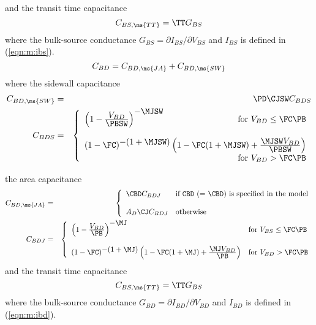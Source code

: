 and the transit time capacitance
\begin{equation}
C_{BS,\ms{TT}} = \TT G_{BS}
\end{equation}
where the bulk-source conductance $G_{BS} = \partial I_{BS} /
\partial V_{BS}$ and $I_{BS}$ is defined in (\ref{eqn:m:ibs}).
\begin{equation}
C_{BD} = C_{BD,\ms{JA}} + C_{BD,\ms{SW}}
\end{equation}
where the sidewall capacitance
\begin{eqnarray}
C_{BD,\ms{SW}} &=& \PD\CJSW C_{BDS} \\
C_{BDS} &=& \left\{ \begin{array}{l}
       \left( 1 - {{\textstyle V_{BD}}
       \over {\textstyle\PBSW}} \right)^{\textstyle -\MJSW}
       \hfill \mbox{for $V_{BD}  \le \FC\PB$} \\ \\
       (1 - \FC )^{\textstyle -(1+\MJSW )}
       \left(1 - \FC (1+\MJSW )
       + {{\textstyle \MJSW V_{BD}}
       \over { \textstyle \PBSW}} \right)
       \\ \hspace*{\fill} \mbox{for $V_{BD}  > \FC\PB$}
       \end{array} \right. \\ %
\end{eqnarray}

the area capacitance
\begin{eqnarray}
C_{BD,\ms{JA}} &=&
  \left\{ \begin{array}{ll}
  \CBD C_{BDJ} &  \mbox{if {\tt CBD} (= $\CBD$)
                    is specified in the model} \\ \\
  A_D\CJ C_{BDJ} & \mbox{otherwise} \end{array} \right. \\ %
C_{BDJ} &=& \left\{ \begin{array}{ll}
       \left(1 - {\textstyle {V_{BD}} \over
       {\textstyle \PB}} \right)^{\textstyle -\MJ}
       & \mbox{for $V_{BS}  \le \FC\PB$} \\ \\
       (1 -\FC)^{\textstyle -(1+\MJ)}
       \left(1 - \FC (1+\MJ)
       + {{\textstyle\MJ V_{BD}} \over {\textstyle \PB}} \right)
       & \mbox{for $V_{BD}  > \FC\PB$}
       \end{array} \right. %
\end{eqnarray}
and the transit time capacitance
\begin{equation}
C_{BS,\ms{TT}} = \TT G_{BS}
\end{equation}
where the bulk-source conductance $G_{BD} = \partial I_{BD} /
\partial V_{BD}$ and $I_{BD}$ is defined in (\ref{eqn:m:ibd}).

